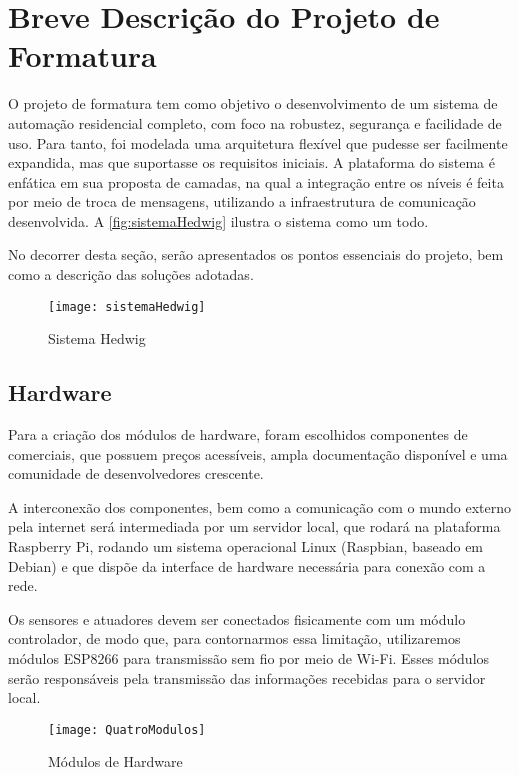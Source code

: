 \chapter{Breve Descrição do Projeto de Formatura}

O projeto de formatura tem como objetivo o desenvolvimento de um sistema de automação residencial completo, com foco na robustez, segurança e facilidade de uso. Para tanto, foi modelada uma arquitetura flexível que pudesse ser facilmente expandida, mas que suportasse os requisitos iniciais. A plataforma do sistema é enfática em sua proposta de camadas, na qual a integração entre os níveis é feita por meio de troca de mensagens, utilizando a infraestrutura de comunicação desenvolvida. A \autoref{fig:sistemaHedwig} ilustra o sistema como um todo.

No decorrer desta seção, serão apresentados os pontos essenciais do projeto, bem como a descrição das soluções adotadas.

\begin{figure}[H]
	\caption{\label{fig:sistemaHedwig}Sistema Hedwig}
	\begin{center}
		\texttt{[image: sistemaHedwig]}
	\end{center}
\end{figure}

\section{Hardware}

Para a criação dos módulos de hardware, foram escolhidos componentes de \wiot{} comerciais, que possuem preços acessíveis, ampla documentação disponível e uma comunidade de desenvolvedores crescente.

A interconexão dos componentes, bem como a comunicação com o mundo externo pela internet será intermediada por um servidor local, que rodará na plataforma Raspberry Pi, rodando um sistema operacional Linux (Raspbian, baseado em Debian) e que dispõe da interface de hardware necessária para conexão com a rede.

Os sensores e atuadores devem ser conectados fisicamente com um módulo controlador, de modo que, para contornarmos essa limitação, utilizaremos módulos ESP8266 para transmissão sem fio por meio de Wi-Fi. Esses módulos serão responsáveis pela transmissão das informações recebidas para o servidor local.

\begin{figure}[H]
	\caption{\label{fig:QuatroModulos}Módulos de Hardware}
	\begin{center}
		\texttt{[image: QuatroModulos]}
	\end{center}
\end{figure}

